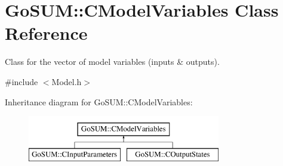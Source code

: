 \hypertarget{class_go_s_u_m_1_1_c_model_variables}{\section{Go\-S\-U\-M\-:\-:C\-Model\-Variables Class Reference}
\label{class_go_s_u_m_1_1_c_model_variables}
}


Class for the vector of model variables (inputs \& outputs).  




{\ttfamily \#include $<$Model.\-h$>$}

Inheritance diagram for Go\-S\-U\-M\-:\-:C\-Model\-Variables\-:\begin{figure}[H]
\begin{center}
\leavevmode
\includegraphics[height=2.000000cm]{class_go_s_u_m_1_1_c_model_variables}
\end{center}
\end{figure}
